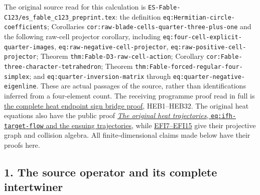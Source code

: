 \documentclass[
  10pt,
  a4paper,
]{article}
\begin{document}
The original source read for this calculation is
\texttt{ES-\allowbreak{}Fable-\allowbreak{}C123/\allowbreak{}es\_\allowbreak{}fable\_\allowbreak{}c123\_\allowbreak{}preprint.\allowbreak{}tex}: the definition
\texttt{eq:\allowbreak{}Hermitian-\allowbreak{}circle-\allowbreak{}coefficients}; Corollaries
\texttt{cor:\allowbreak{}raw-\allowbreak{}blade-\allowbreak{}cells-\allowbreak{}quarter-\allowbreak{}three-\allowbreak{}plus-\allowbreak{}one} and the following
raw-cell projector corollary, including
\texttt{eq:\allowbreak{}four-\allowbreak{}cell-\allowbreak{}explicit-\allowbreak{}quarter-\allowbreak{}images},
\texttt{eq:\allowbreak{}raw-\allowbreak{}negative-\allowbreak{}cell-\allowbreak{}projector},
\texttt{eq:\allowbreak{}raw-\allowbreak{}positive-\allowbreak{}cell-\allowbreak{}projector}; Theorem
\texttt{thm:\allowbreak{}Fable-\allowbreak{}D3-\allowbreak{}raw-\allowbreak{}cell-\allowbreak{}action}; Corollary
\texttt{cor:\allowbreak{}Fable-\allowbreak{}three-\allowbreak{}character-\allowbreak{}tetrahedron}; Theorem
\texttt{thm:\allowbreak{}Fable-\allowbreak{}forced-\allowbreak{}regular-\allowbreak{}four-\allowbreak{}simplex}; and
\texttt{eq:\allowbreak{}quarter-\allowbreak{}inversion-\allowbreak{}matrix} through
\texttt{eq:\allowbreak{}quarter-\allowbreak{}negative-\allowbreak{}eigenline}. These are actual passages of the
source, rather than identifications inferred from a four-element count.
The receiving programme proof read in full is
\href{https://github.com/KokunoYumeto/zeta-function-research-reader/blob/d5c9d198a8432e3ede468b280162a99c00e3f4f7/workbenches/splitzero-tandem/branches/tau-zero-prime-positivity/HEAT_ENDPOINT_SIGN_BRIDGE.md}{the
complete heat endpoint sign bridge proof}, HEB1--HEB32. The original
heat equations also have the public proof
\href{https://github.com/KokunoYumeto/zeta-function-research-reader/blob/ac168d55cbb400a6c8926a00d67909ba65646ac5/satellites/26_incompressible_fibre_heat.tex\#L389}{\emph{The
original heat trajectories}, \texttt{eq:\allowbreak{}ifh-\allowbreak{}target-\allowbreak{}flow} and the ensuing
trajectories}, while
\href{https://github.com/KokunoYumeto/zeta-function-research-reader/blob/173dbc6ed5a03235dbe7654f928f3692107db39b/workbenches/splitzero-tandem/branches/tau-zero-prime-positivity/ESCAPING_FIBRE_INFINITESIMAL_DERIVATION.md\#L89}{EFI7--EFI15}
give their projective graph and collision algebra. All
finite-dimensional claims made below have their proofs here.

\subsection{1. The source operator and its complete
intertwiner}\label{the-source-operator-and-its-complete-intertwiner}
\end{document}
